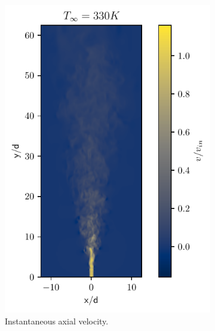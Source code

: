 \begin{figure}[htbp!]
\begin{subfigure}{0.25\textwidth}
	\centering
	\includegraphics[scale=.65]{figures/Plots/vertical/330/v_scaled_vert_330.pdf}
	\caption{Instantaneous axial velocity.} \label{330_v_1}
\end{subfigure}
\hfill
\begin{subfigure}{0.25\textwidth}
	\centering

\end{subfigure}
\end{figure}

